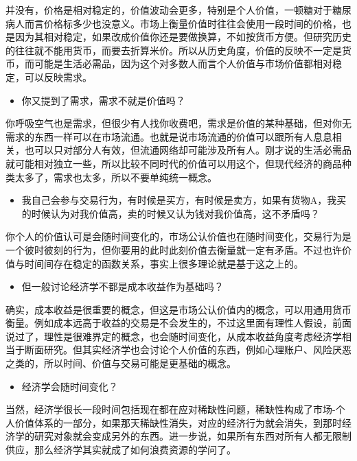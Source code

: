 \documentclass[
  letterpaper,
  DIV=11,
  numbers=noendperiod]{scrreprt}
\providecommand{\tightlist}{%
  \setlength{\itemsep}{0pt}\setlength{\parskip}{0pt}}\usepackage{longtable,booktabs,array}
\begin{document}
并没有，价格是相对稳定的，价值波动会更多，特别是个人价值，一顿糖对于糖尿病人而言价格标多少也没意义。市场上衡量价值时往往会使用一段时间的价格，也是因为其相对稳定，如果改成价值你还是要做换算，不如按货币方便。但研究历史的往往就不能用货币，而要去折算米价。所以从历史角度，价值的反映不一定是货币，而可能是生活必需品，因为这个对多数人而言个人价值与市场价值都相对稳定，可以反映需求。

\begin{itemize}
\tightlist
\item
  你又提到了需求，需求不就是价值吗？
\end{itemize}

你呼吸空气也是需求，但很少有人找你收费吧，需求是价值的某种基础，但对你无需求的东西一样可以在市场流通。也就是说市场流通的价值可以跟所有人息息相关，也可以只对部分人有效，但流通网络却可能涉及所有人。刚才说的生活必需品就可能相对独立一些，所以比较不同时代的价值可以用这个，但现代经济的商品种类太多了，需求也太多，所以不要单纯统一概念。

\begin{itemize}
\tightlist
\item
  我自己会参与交易行为，有时候是买方，有时候是卖方，如果有货物A，我买的时候认为对我价值高，卖的时候又认为钱对我价值高，这不矛盾吗？
\end{itemize}

你个人的价值认可是会随时间变化的，市场公认价值也在随时间变化，交易行为是一个彼时彼刻的行为，但你要用的此时此刻价值去衡量就一定有矛盾。不过也许价值与时间间存在稳定的函数关系，事实上很多理论就是基于这之上的。

\begin{itemize}
\tightlist
\item
  但一般讨论经济学不都是成本收益作为基础吗？
\end{itemize}

确实，成本收益是很重要的概念，但这是市场公认价值内的概念，可以用通用货币衡量。例如成本远高于收益的交易是不会发生的，不过这里面有理性人假设，前面说过了，理性是很难界定的概念，也会随时间变化，从成本收益角度考虑经济学相当于断面研究。但其实经济学也会讨论个人价值的东西，例如心理账户、风险厌恶之类的，所以时间、价值与交易可能是更基础的概念。

\begin{itemize}
\tightlist
\item
  经济学会随时间变化？
\end{itemize}

当然，经济学很长一段时间包括现在都在应对稀缺性问题，稀缺性构成了市场-个人价值体系的一部分，如果那天稀缺性消失，对应的经济行为就会消失，到那时经济学的研究对象就会变成另外的东西。进一步说，如果所有东西对所有人都无限制供应，那么经济学其实就成了如何浪费资源的学问了。
\end{document}
